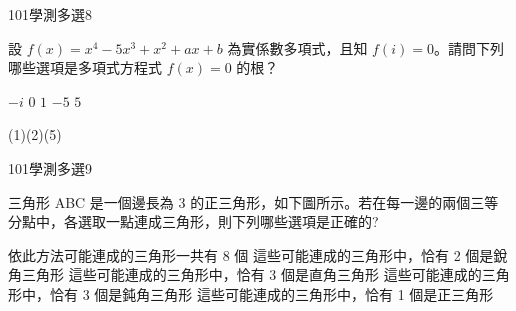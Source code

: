 \begin{QUESTIONS}
    \begin{QUESTION}
        \begin{ExamInfo}{101}{學測}{多選}{8}
        \end{ExamInfo}
        \begin{ExamAnsRateInfo}{56}{92}{58}{18}
        \end{ExamAnsRateInfo}
        \begin{QBODY}
		設 $f(x) = x^4-5x^3+x^2+ax+b$ 為實係數多項式，且知 $f( i)  =0 $。請問下列哪些選項是多項式方程式 $f (x ) = 0$ 的根？
		\begin{QOPS} 
			\QOP  $-i$ 
			\QOP  $0$
			\QOP  $1$ 
			\QOP  $-5$ 
			\QOP  $5$
		\end{QOPS}
        \end{QBODY}
        \begin{QFROMS}
        \end{QFROMS}
        \begin{QTAGS}\end{QTAGS}
        \begin{QANS}
            (1)(2)(5)
        \end{QANS}
        \begin{QSOLLIST}
        \end{QSOLLIST}
        \begin{QEMPTYSPACE}
        \end{QEMPTYSPACE}
    \end{QUESTION}
    \begin{QUESTION}
        \begin{ExamInfo}{101}{學測}{多選}{9}
        \end{ExamInfo}
        \begin{ExamAnsRateInfo}{51}{77}{51}{25}
        \end{ExamAnsRateInfo}
        \begin{QBODY}
			三角形 ABC 是一個邊長為 3 的正三角形，如下圖所示。若在每一邊的兩個三等分點中，各選取一點連成三角形，則下列哪些選項是正確的?

			\begin{QOPS} 
				\QOP 依此方法可能連成的三角形一共有 8 個
				\QOP 這些可能連成的三角形中，恰有 2 個是銳角三角形 \QOP 這些可能連成的三角形中，恰有 3 個是直角三角形
				\QOP 這些可能連成的三角形中，恰有 3 個是鈍角三角形
				\QOP 這些可能連成的三角形中，恰有 1 個是正三角形
			\end{QOPS}


\end{QBODY}
\end{QUESTION}
\end{QUESTIONS}
